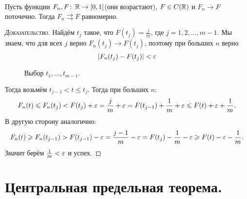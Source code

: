 \documentclass[../main.tex]{subfiles}
\begin{document}
\begin{thm}
 Пусть функции $ F_n, F \colon\, \mathbb{R} \to [0,1] $(они возрастают), $ F \in C(\mathbb{R}) $ и $ F_n \to F $ поточечно. Тогда $ F_n \rightrightarrows F $ равномерно.
\end{thm}
\begin{proof}[\normalfont\textsc{Доказательство}]
 Найдём $ t_j $ такое, что $ F(t_j) = \frac{j}{m} $, где $ j = 1, 2, \ldots, m - 1 $. Мы знаем, что для всех $ j $ верно $ F_n(t_j) \to F(t_j) $, поэтому при больших $ n $ верно
 \begin{align*}
  \left| F_n(t_j) - F(t_j) \right| < \varepsilon
 \end{align*}

 \begin{figure}[ht]
  \centering
  \caption{Выбор $t_1, \dots, t_{m-1}$. }
  \label{fig:distribution_function_points_to_evenlly}
 \end{figure}

 Тогда возьмём $ t_{j-1} < t \leqslant t_j $. Тогда при больших $ n $:
 \begin{align*}
  F_n(t) \leqslant F_n(t_j) < F(t_j) + \varepsilon = \frac{j}{m} + \varepsilon = F(t_{j-1}) + \frac{1}{m} + \varepsilon \leqslant F(t) + \varepsilon + \frac{1}{m}.
 \end{align*} В другую сторону аналогично:
 \begin{align*}
  F_n(t) \geqslant F_n(t_{j-1}) > F(t_{j-1}) - \varepsilon = \frac{j-1}{m} - \varepsilon = F(t_j) - \frac{1}{m} - \varepsilon \geqslant F(t) - \varepsilon - \frac{1}{m}.
 \end{align*} Значит берём $ \frac{1}{m} < \varepsilon $ и успех.
\end{proof}

\newpage
\section{Центральная предельная теорема.}
\end{document}
